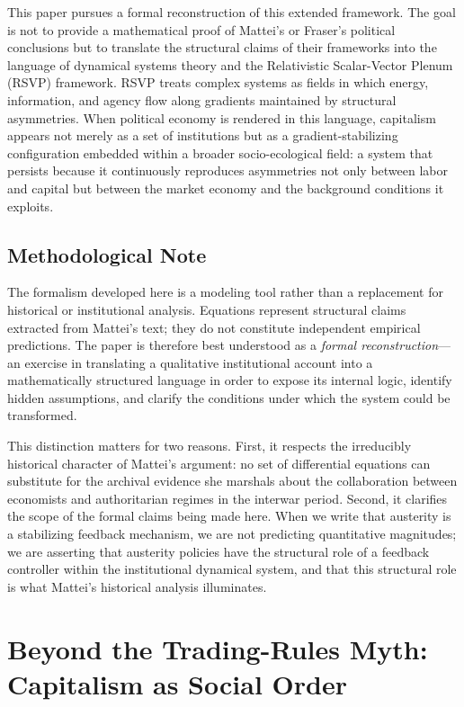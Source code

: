 \documentclass[12pt,a4paper]{article}
\theoremstyle{definition}
\theoremstyle{remark}
\begin{document}
This paper pursues a formal reconstruction of this extended framework. The goal is not to provide a mathematical proof of Mattei's or Fraser's political conclusions but to translate the structural claims of their frameworks into the language of dynamical systems theory and the Relativistic Scalar-Vector Plenum (RSVP) framework. RSVP treats complex systems as fields in which energy, information, and agency flow along gradients maintained by structural asymmetries. When political economy is rendered in this language, capitalism appears not merely as a set of institutions but as a gradient-stabilizing configuration embedded within a broader socio-ecological field: a system that persists because it continuously reproduces asymmetries not only between labor and capital but between the market economy and the background conditions it exploits.

\subsection*{Methodological Note}

The formalism developed here is a modeling tool rather than a replacement for historical or institutional analysis. Equations represent structural claims extracted from Mattei's text; they do not constitute independent empirical predictions. The paper is therefore best understood as a \emph{formal reconstruction}---an exercise in translating a qualitative institutional account into a mathematically structured language in order to expose its internal logic, identify hidden assumptions, and clarify the conditions under which the system could be transformed.

This distinction matters for two reasons. First, it respects the irreducibly historical character of Mattei's argument: no set of differential equations can substitute for the archival evidence she marshals about the collaboration between economists and authoritarian regimes in the interwar period. Second, it clarifies the scope of the formal claims being made here. When we write that austerity is a stabilizing feedback mechanism, we are not predicting quantitative magnitudes; we are asserting that austerity policies have the structural role of a feedback controller within the institutional dynamical system, and that this structural role is what Mattei's historical analysis illuminates.

\section{Beyond the Trading-Rules Myth: Capitalism as Social Order}
\label{sec:social_order}
\end{document}
